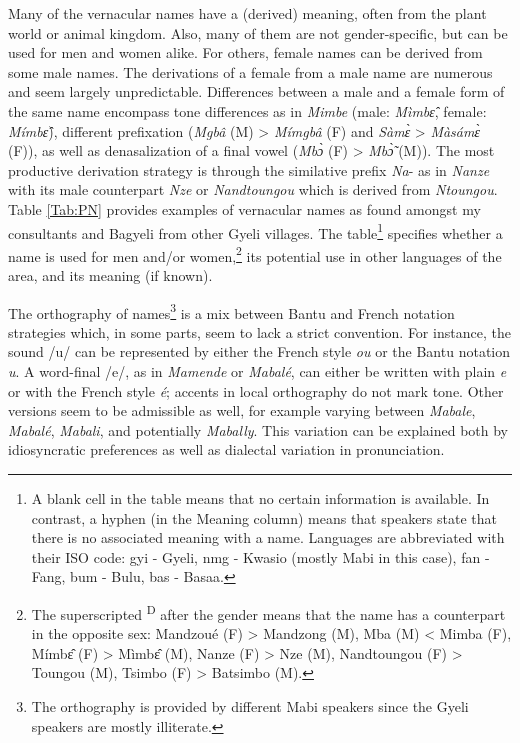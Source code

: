 Many of the vernacular names have a (derived) meaning, often from the plant world or animal kingdom. Also, many of them are not gender-specific, but can be used for men and women alike. For others, female names can be derived from some male names. The derivations of a female from a male name are numerous and seem largely unpredictable. Differences between a male and a female form of the same name encompass tone differences as in {\itshape Mimbe} (male: {\itshape Mìmbɛ̂}, female: {\itshape Mímbɛ̂}), different prefixation ({\itshape Mgbâ} (M) > {\itshape Mímgbâ} (F) and {\itshape Sàmɛ̀} > {\itshape Màsámɛ̀} (F)), as well as denasalization of a final vowel ({\itshape Mbɔ̀} (F) > {\itshape Mbɔ̃̀} (M)). The most productive derivation strategy is through the similative prefix {\itshape Na}- as in {\itshape Nanze} with its male counterpart {\itshape Nze} or {\itshape Nandtoungou} which is derived from {\itshape Ntoungou}.
Table \ref{Tab:PN} provides examples of vernacular names as found amongst my consultants and Bagyeli from other Gyeli villages. The table\footnote{A blank cell in the table means that no certain information is available. In contrast, a hyphen (in the Meaning column) means that speakers state that there is no associated meaning with a name.  Languages are abbreviated with their ISO code: gyi - Gyeli, nmg - Kwasio (mostly Mabi in this case), fan - Fang, bum - Bulu, bas - Basaa.} specifies whether a name is used for men and/or women,\footnote{The superscripted \textsuperscript{D} after the gender means that the name has a counterpart in the opposite sex: Mandzoué (F) > Mandzong (M), Mba (M) < Mimba (F),  Mímbɛ̂ (F) > Mìmbɛ̂ (M), Nanze (F) > Nze (M), Nandtoungou (F) > Toungou (M), Tsimbo (F) > Batsimbo (M).} its potential use in other languages of the area, and its meaning (if known).  

The orthography of names\footnote{The orthography is provided by different Mabi speakers since the Gyeli speakers are mostly illiterate.} is a mix between Bantu and French notation strategies which, in some parts, seem to lack a strict convention. For instance, the sound /u/ can be represented by either the French style {\itshape ou} or the Bantu notation {\itshape u}. A word-final /e/, as in {\itshape Mamende} or {\itshape Mabalé}, can either be written with plain {\itshape e} or with the French style {\itshape é}; accents in local orthography do not mark tone. Other versions seem to be admissible as well, for example varying between {\itshape Mabale}, {\itshape Mabalé}, {\itshape Mabali}, and potentially {\itshape Mabally}. This variation can be explained both by idiosyncratic preferences as well as dialectal variation in pronunciation.

